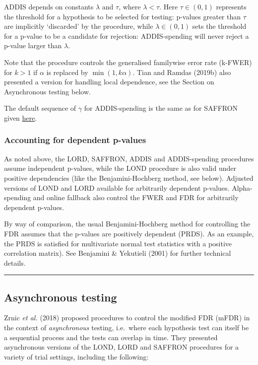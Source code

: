 \documentclass[
]{article}
\begin{document}
ADDIS depends on constants \(\lambda\) and \(\tau\), where
\(\lambda < \tau\). Here \(\tau \in (0,1)\) represents the threshold for
a hypothesis to be selected for testing: p-values greater than \(\tau\)
are implicitly `discarded' by the procedure, while \(\lambda \in (0,1)\)
sets the threshold for a p-value to be a candidate for rejection:
ADDIS-spending will never reject a p-value larger than \(\lambda\).

Note that the procedure controls the generalised familywise error rate
(k-FWER) for \(k > 1\) if \(\alpha\) is replaced by \(\min(1,k\alpha)\).
Tian and Ramdas (2019b) also presented a version for handling local
dependence, see the Section on Asynchronous testing below.

The default sequence of \(\gamma\) for ADDIS-spending is the same as for
SAFFRON given \protect\hyperlink{SAFFRON_gamma}{here}.

\hypertarget{accounting-for-dependent-p-values}{%
\subsubsection{Accounting for dependent
p-values}\label{accounting-for-dependent-p-values}}

As noted above, the LORD, SAFFRON, ADDIS and ADDIS-spending procedures
assume independent p-values, while the LOND procedure is also valid
under positive dependencies (like the Benjamini-Hochberg method, see
below). Adjusted versions of LOND and LORD available for arbitrarily
dependent p-values. Alpha-spending and online fallback also control the
FWER and FDR for arbitrarily dependent p-values.

By way of comparison, the usual Benjamini-Hochberg method for
controlling the FDR assumes that the p-values are positively dependent
(PRDS). As an example, the PRDS is satisfied for multivariate normal
test statistics with a positive correlation matrix). See Benjamini \&
Yekutieli (2001) for further technical details.

\begin{center}\rule{0.5\linewidth}{0.5pt}\end{center}

\hypertarget{asynchronous-testing}{%
\subsection{Asynchronous testing}\label{asynchronous-testing}}

Zrnic \emph{et al.} (2018) proposed procedures to control the modified
FDR (mFDR) in the context of \emph{asynchronous} testing, i.e.~where
each hypothesis test can itself be a sequential process and the tests
can overlap in time. They presented asynchronous versions of the LOND,
LORD and SAFFRON procedures for a variety of trial settings, including
the following:
\end{document}
